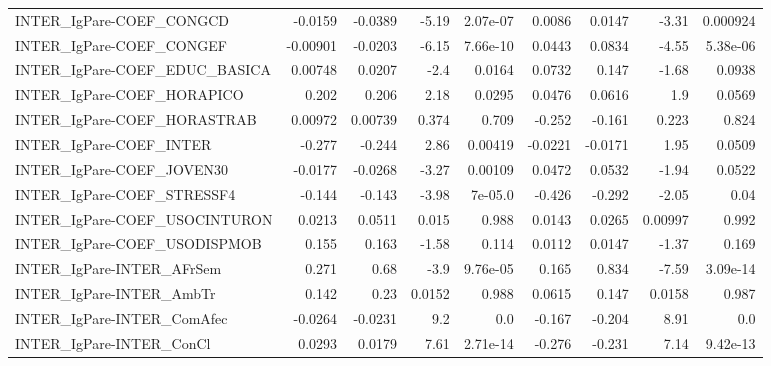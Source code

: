\begin{tabular}{lrrrrrrrr}
INTER\_IgPare-COEF\_CONGCD              &     -0.0159 &      -0.0389 &    -5.19 & 2.07e-07 &     0.0086 &      0.0147 &        -3.31 &      0.000924 \\
INTER\_IgPare-COEF\_CONGEF              &    -0.00901 &      -0.0203 &    -6.15 & 7.66e-10 &     0.0443 &      0.0834 &        -4.55 &      5.38e-06 \\
INTER\_IgPare-COEF\_EDUC\_BASICA         &     0.00748 &       0.0207 &     -2.4 &   0.0164 &     0.0732 &       0.147 &        -1.68 &        0.0938 \\
INTER\_IgPare-COEF\_HORAPICO            &       0.202 &        0.206 &     2.18 &   0.0295 &     0.0476 &      0.0616 &          1.9 &        0.0569 \\
INTER\_IgPare-COEF\_HORASTRAB           &     0.00972 &      0.00739 &    0.374 &    0.709 &     -0.252 &      -0.161 &        0.223 &         0.824 \\
INTER\_IgPare-COEF\_INTER               &      -0.277 &       -0.244 &     2.86 &  0.00419 &    -0.0221 &     -0.0171 &         1.95 &        0.0509 \\
INTER\_IgPare-COEF\_JOVEN30             &     -0.0177 &      -0.0268 &    -3.27 &  0.00109 &     0.0472 &      0.0532 &        -1.94 &        0.0522 \\
INTER\_IgPare-COEF\_STRESSF4            &      -0.144 &       -0.143 &    -3.98 &  7e-05.0 &     -0.426 &      -0.292 &        -2.05 &          0.04 \\
INTER\_IgPare-COEF\_USOCINTURON         &      0.0213 &       0.0511 &    0.015 &    0.988 &     0.0143 &      0.0265 &      0.00997 &         0.992 \\
INTER\_IgPare-COEF\_USODISPMOB          &       0.155 &        0.163 &    -1.58 &    0.114 &     0.0112 &      0.0147 &        -1.37 &         0.169 \\
INTER\_IgPare-INTER\_AFrSem             &       0.271 &         0.68 &     -3.9 & 9.76e-05 &      0.165 &       0.834 &        -7.59 &      3.09e-14 \\
INTER\_IgPare-INTER\_AmbTr              &       0.142 &         0.23 &   0.0152 &    0.988 &     0.0615 &       0.147 &       0.0158 &         0.987 \\
INTER\_IgPare-INTER\_ComAfec            &     -0.0264 &      -0.0231 &      9.2 &      0.0 &     -0.167 &      -0.204 &         8.91 &           0.0 \\
INTER\_IgPare-INTER\_ConCl              &      0.0293 &       0.0179 &     7.61 & 2.71e-14 &     -0.276 &      -0.231 &         7.14 &      9.42e-13 \\

\end{tabular}
